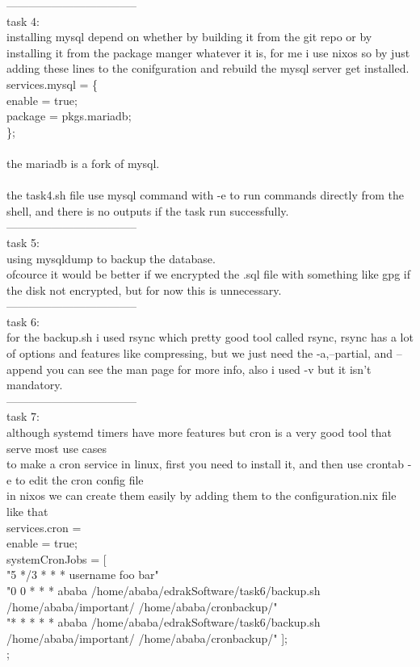 \documentclass[a4paper,14pt]{extarticle}
\begin{document}
-----------------------------------\\
task 4:\\
installing mysql depend on whether by building it from the git repo or by installing it from the package manger whatever it is, for me i use nixos so by just adding these lines to the conifguration and rebuild the mysql server get installed.\\
services.mysql = \{\\
  enable = true;\\
  package = pkgs.mariadb;\\
\};\\
\\
the mariadb is a fork of mysql.\\
\\
the task4.sh file use mysql command with -e to run commands directly from the shell, and there is no outputs if the task run successfully.\\
-----------------------------------\\
task 5:\\
using mysqldump to backup the database.\\ofcource it would be better if we encrypted the .sql file with something like gpg if the disk not encrypted, but for now this is unnecessary.\\
-----------------------------------\\
task 6:\\
for the backup.sh i used rsync which pretty good tool called rsync, rsync has a lot of options and features like compressing, but we just need the -a,--partial, and --append you can see the man page for more info, also i used -v but it isn't mandatory.\\
-----------------------------------\\
task 7:\\
although systemd timers have more features but cron is a very good tool that serve most use cases\\
to make a cron service in linux, first you need to install it, and then use crontab -e to edit the cron config file\\
in nixos we can create them easily by adding them to the configuration.nix file like that \\
services.cron = {\\
    enable = true;\\
    systemCronJobs = [\\
      "5 */3 * * *  username    foo   bar"\\
      "0 0 * * *  ababa    /home/ababa/edrakSoftware/task6/backup.sh /home/ababa/important/ /home/ababa/cronbackup/"\\
      "* * * * *  ababa    /home/ababa/edrakSoftware/task6/backup.sh /home/ababa/important/ /home/ababa/cronbackup/"
    ];\\
  };\\

\pagestyle{empty}
\end{document}
